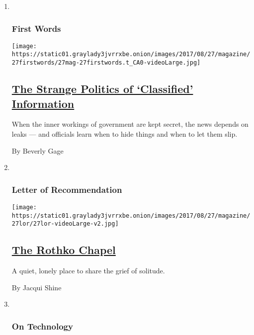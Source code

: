 \begin{enumerate}
\def\labelenumi{\arabic{enumi}.}
\item ~
  \hypertarget{first-words}{%
  \subsubsection{First Words}\label{first-words}}

  \texttt{[image: https://static01.graylady3jvrrxbe.onion/images/2017/08/27/magazine/27firstwords/27mag-27firstwords.t\_CA0-videoLarge.jpg]}

  \hypertarget{the-strange-politics-of-classified-information}{%
  \subsection{\texorpdfstring{\href{/2017/08/22/magazine/the-strange-politics-of-classified-information.html}{The
  Strange Politics of `Classified'
  Information}}{The Strange Politics of `Classified' Information}}\label{the-strange-politics-of-classified-information}}

  When the inner workings of government are kept secret, the news
  depends on leaks --- and officials learn when to hide things and when
  to let them slip.

  By Beverly Gage
\item ~
  \hypertarget{letter-of-recommendation}{%
  \subsubsection{Letter of
  Recommendation}\label{letter-of-recommendation}}

  \texttt{[image: https://static01.graylady3jvrrxbe.onion/images/2017/08/27/magazine/27lor/27lor-videoLarge-v2.jpg]}

  \hypertarget{the-rothko-chapel}{%
  \subsection{\texorpdfstring{\href{/2017/08/23/magazine/the-rothko-chapel.html}{The
  Rothko Chapel}}{The Rothko Chapel}}\label{the-rothko-chapel}}

  A quiet, lonely place to share the grief of solitude.

  By Jacqui Shine
\item ~
  \hypertarget{on-technology}{%
  \subsubsection{On Technology}\label{on-technology}}


\end{enumerate}
